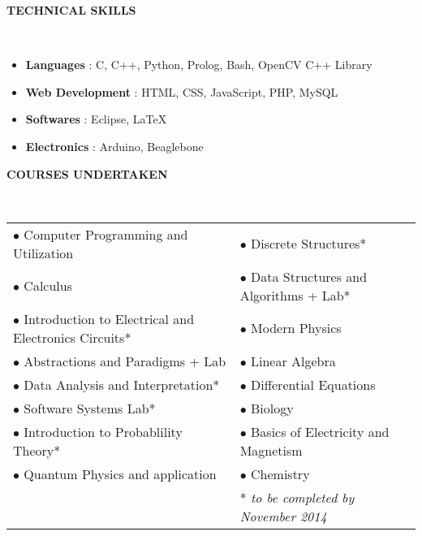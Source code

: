 \documentclass[a4paper,10pt]{article}
\newcommand{\lsep}{-0.5cm}
\newcommand{\resheading}[1]{{\small \colorbox{mygrey}{\begin{minipage}{0.975\textwidth}{\textbf{#1 \vphantom{p\^{E}}}}\end{minipage}}}}
\begin{document}
\resheading{\textbf{TECHNICAL SKILLS} }\\[\lsep]
\begin{itemize}
  \itemsep 0em
  \item \textbf{Languages} : C, C++, Python, Prolog, Bash, OpenCV C++ Library 
  \item \textbf{Web Development} : HTML, CSS, JavaScript, PHP, MySQL
  \item \textbf{Softwares} : Eclipse, \LaTeX
  \item \textbf{Electronics} : Arduino, Beaglebone
\end{itemize} 

\resheading{\textbf{COURSES UNDERTAKEN} } \\
  \begin{centering}
  \setlength{\tabcolsep}{1em}
  \begin{tabular}{l l}
    \hspace*{1cm} $\bullet$ Computer Programming and Utilization & $ \bullet $ Discrete Structures* \\
    \hspace*{1cm} $\bullet$ Calculus & $\bullet$ Data Structures and Algorithms + Lab* \\
    \hspace*{1cm} $\bullet$ Introduction to Electrical and Electronics Circuits* & $\bullet$ Modern Physics  \\
    \hspace*{1cm} $\bullet$ Abstractions and Paradigms + Lab & $\bullet$ Linear Algebra  \\
    \hspace*{1cm} $\bullet$ Data Analysis and Interpretation* & $\bullet$ Differential Equations  \\
    \hspace*{1cm} $\bullet$ Software Systems Lab* & $\bullet$ Biology  \\
    \hspace*{1cm} $\bullet$ Introduction to Probablility Theory* & $\bullet$ Basics of Electricity and Magnetism \\
    \hspace*{1cm} $\bullet$ Quantum Physics and application & $\bullet$ Chemistry \\
    & \hspace*{23mm} * {\it to be completed by November 2014}
  \end{tabular}
  \end{centering}
\end{document}
